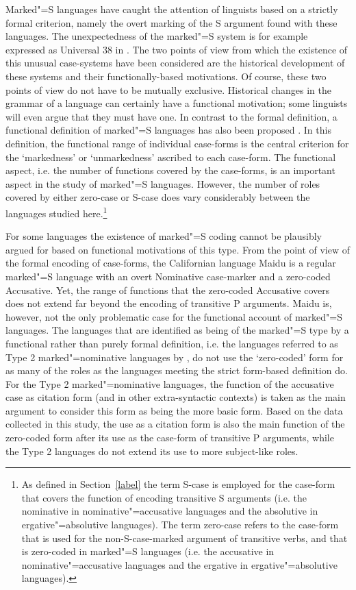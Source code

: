 Marked"=S languages have caught the attention of linguists based on a strictly formal criterion, namely the overt marking of the S argument found with these languages. 
The unexpectedness of the marked"=S system is for example expressed as Universal 38 in \citet[75]{Greenberg:1963}.
The two points of view from which the existence of this unusual case-systems have been considered are  the historical development of these systems and their functionally-based motivations. Of course, these two points of view do not have to be mutually exclusive. Historical changes in the grammar of a language can certainly have a functional motivation; some linguists will even argue that they must have one. 
In contrast to the formal definition, a functional definition of marked"=S languages has also been
proposed \citep{Koenig:2006}.%
\enlargethispage{\baselineskip}
In this definition, the functional range of individual case-forms is the central criterion for the `markedness' or `unmarkedness' ascribed to each case-form.
The functional aspect, i.e. the number of functions covered by the case-forms, is an important aspect in the study of marked"=S languages.  
 However, the number of roles covered by either zero-case or S-case does vary considerably between the languages studied here.\footnote{As defined in Section~\ref{label} the term S-case is employed for the case-form that covers the function of encoding transitive S arguments (i.e. the nominative in nominative"=accusative languages and the absolutive in ergative"=absolutive languages). The term zero-case refers to the case-form that is used for the non-S-case-marked argument of transitive verbs, and that is zero-coded in marked"=S languages (i.e. the accusative in nominative"=accusative languages and the ergative in ergative"=absolutive languages).}

For some languages the existence of marked"=S coding cannot be plausibly argued for based on functional motivations of this type.
From the point of view of the formal encoding of case-forms, the Californian language Maidu is a regular marked"=S language with an overt Nominative case-marker and a zero-coded Accusative. 
Yet, the range of functions that the zero-coded Accusative covers does not extend far beyond the encoding of transitive P arguments. 
Maidu is, however, not the only problematic case for the functional account of marked"=S languages. 
The languages that are identified as being of the marked"=S type by a functional rather than purely formal definition, i.e. the languages referred to as Type 2 marked"=nominative languages by \citet[658]{Koenig:2006}, do not use the `zero-coded' form for as many of the roles as the languages meeting the strict form-based definition do.  
For the Type 2 marked"=nominative languages, the function of the accusative case as citation form (and in other extra-syntactic contexts) is taken as the main argument to consider this form as being the more basic form. 
Based on the data collected in this study, the use as a citation form is also the main function of the zero-coded form after its use as the case-form of transitive P arguments, while the Type 2 languages do not extend its use to more subject-like roles.

